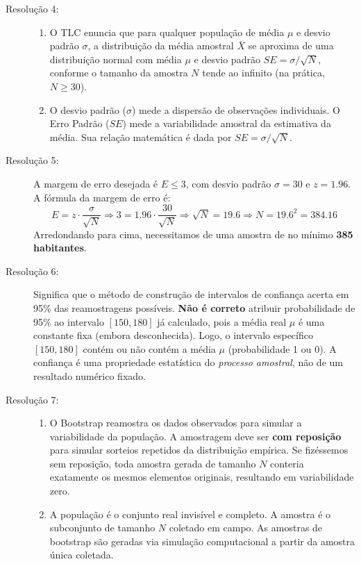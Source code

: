 \documentclass[12pt]{article}
\begin{document}
\begin{description}
    \item[Resolução 4:] 
    \begin{enumerate}[label=\alph*)]
        \item O TLC enuncia que para qualquer população de média $\mu$ e desvio padrão $\sigma$, a distribuição da média amostral $\bar{X}$ se aproxima de uma distribuição normal com média $\mu$ e desvio padrão $SE = \sigma/\sqrt{N}$, conforme o tamanho da amostra $N$ tende ao infinito (na prática, $N \geq 30$).
        \item O desvio padrão ($\sigma$) mede a dispersão de observações individuais. O Erro Padrão ($SE$) mede a variabilidade amostral da estimativa da média. Sua relação matemática é dada por $SE = \sigma / \sqrt{N}$.
    \end{enumerate}

    \item[Resolução 5:] A margem de erro desejada é $E \le 3$, com desvio padrão $\sigma = 30$ e $z = 1.96$. A fórmula da margem de erro é:
    $$E = z \cdot \frac{\sigma}{\sqrt{N}} \Rightarrow 3 = 1.96 \cdot \frac{30}{\sqrt{N}} \Rightarrow \sqrt{N} = 19.6 \Rightarrow N = 19.6^2 = 384.16$$
    Arredondando para cima, necessitamos de uma amostra de no mínimo \textbf{385 habitantes}.

    \item[Resolução 6:] Significa que o método de construção de intervalos de confiança acerta em 95\% das reamostragens possíveis. \textbf{Não é correto} atribuir probabilidade de 95\% ao intervalo $[150, 180]$ já calculado, pois a média real $\mu$ é uma constante fixa (embora desconhecida). Logo, o intervalo específico $[150, 180]$ contém ou não contém a média $\mu$ (probabilidade 1 ou 0). A confiança é uma propriedade estatística do \textit{processo amostral}, não de um resultado numérico fixado.

    \item[Resolução 7:] 
    \begin{enumerate}[label=\alph*)]
        \item O Bootstrap reamostra os dados observados para simular a variabilidade da população. A amostragem deve ser \textbf{com reposição} para simular sorteios repetidos da distribuição empírica. Se fizéssemos sem reposição, toda amostra gerada de tamanho $N$ conteria exatamente os mesmos elementos originais, resultando em variabilidade zero.
        \item A população é o conjunto real invisível e completo. A amostra é o subconjunto de tamanho $N$ coletado em campo. As amostras de bootstrap são geradas via simulação computacional a partir da amostra única coletada.
    \end{enumerate}


\end{description}
\end{document}
